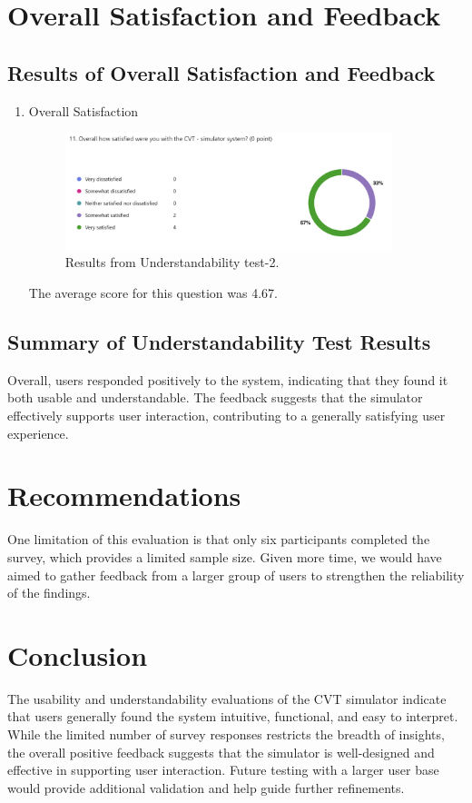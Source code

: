 \documentclass[12pt, titlepage]{article}
\begin{document}
  \section{Overall Satisfaction and Feedback}
  \subsection{Results of Overall Satisfaction and Feedback}
  \begin{enumerate}
    \item Overall Satisfaction
    \begin{figure}[H]  %
      \centering
      \includegraphics[width=0.9\textwidth]{overall.png}  %
      \caption{Results from Understandability test-2.}
      \label{fig:myimage}
    \end{figure}
    The average score for this question was 4.67.
  \end{enumerate}

\subsection{Summary of Understandability Test Results}

Overall, users responded positively to the system, indicating that they found it both usable and understandable. 
The feedback suggests that the simulator effectively supports user interaction, contributing to a generally satisfying user experience.
\section{Recommendations}

One limitation of this evaluation is that only six participants completed the survey, which provides a limited sample size. 
Given more time, we would have aimed to gather feedback from a larger group of users to strengthen the reliability of the findings.
\section{Conclusion}

The usability and understandability evaluations of the CVT simulator indicate that users generally found the system intuitive, functional, and easy to interpret. 
While the limited number of survey responses restricts the breadth of insights, the overall positive feedback suggests that the simulator is well-designed and effective in supporting user interaction. 
Future testing with a larger user base would provide additional validation and help guide further refinements.

\newpage{}
\end{document}
